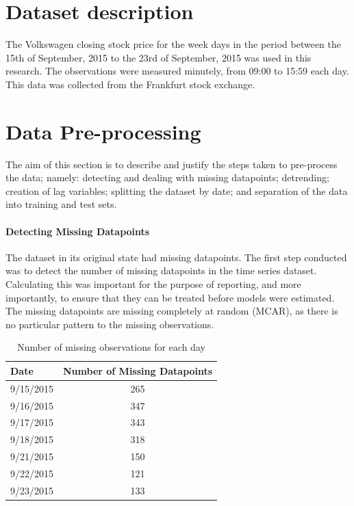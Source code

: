 \documentclass[13pt]{report}
\begin{document}
\section{Dataset description}
The Volkswagen closing stock price for the week days in the period between the 15th of September, 2015 to the 23rd of September, 2015 was used in this research. The observations were measured minutely, from 09:00 to 15:59 each day. This data was collected from the Frankfurt stock exchange.

\section{Data Pre-processing}
The aim of this section is to describe and justify the steps taken to pre-process the data; namely: detecting and dealing with missing datapoints; detrending; creation of lag variables; splitting the dataset by date; and separation of the data into training and test sets.

\paragraph{Detecting Missing Datapoints} \hfill \break
The dataset in its original state had missing datapoints. The first step conducted was to detect the number of missing datapoints in the time series dataset. Calculating this was important for the purpose of reporting, and more importantly, to ensure that they can be treated before models were estimated. The missing datapoints are missing completely at random (MCAR), as there is no particular pattern to the missing observations.

\begin{table}[H]
\centering
\label{missingdata}
\begin{tabular}{|c|c|}
\hline
\multicolumn{1}{|l|}{\textbf{Date}} & \multicolumn{1}{l|}{\textbf{Number of Missing Datapoints}} \\ \hline
9/15/2015                           & 265                                                        \\ \hline
9/16/2015                           & 347                                                        \\ \hline
9/17/2015                           & 343                                                        \\ \hline
9/18/2015                           & 318                                                        \\ \hline
9/21/2015                           & 150                                                        \\ \hline
9/22/2015                           & 121                                                        \\ \hline
9/23/2015                           & 133                                                        \\ \hline
\end{tabular}
\caption{Number of missing observations for each day}
\end{table}
\end{document}
